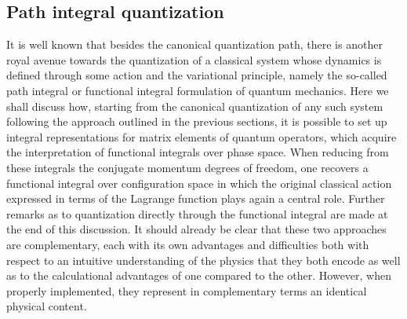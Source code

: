 \documentclass[a4paper,11pt]{article}
\begin{document}
\subsection{Path integral quantization}

It is well known that besides the canonical quantization path,
there is another royal avenue towards the quantization of a classical
system whose dynamics is defined through some action and the variational
principle, namely the so-called path integral or functional integral 
formulation of quantum mechanics.\cite{Feynman} Here we shall discuss how,
starting from the canonical quantization of any such system following
the approach outlined in the previous sections, it is possible to set up
integral representations for matrix elements of quantum operators, which
acquire the interpretation of functional integrals over phase space.
When reducing from these integrals the conjugate momentum degrees of
freedom, one recovers a functional integral over configuration space
in which the original classical action expressed in terms of the
Lagrange function plays again a central role. Further remarks as to
quantization directly through the functional integral are made
at the end of this discussion. It should already be clear
that these two approaches are complementary, each with its own
advantages and difficulties both with respect to an intuitive 
understanding of the physics that they both encode as well as to the
calculational advantages of one compared to the other. However, when properly 
implemented, they represent in complementary terms an identical
physical content.
\end{document}

